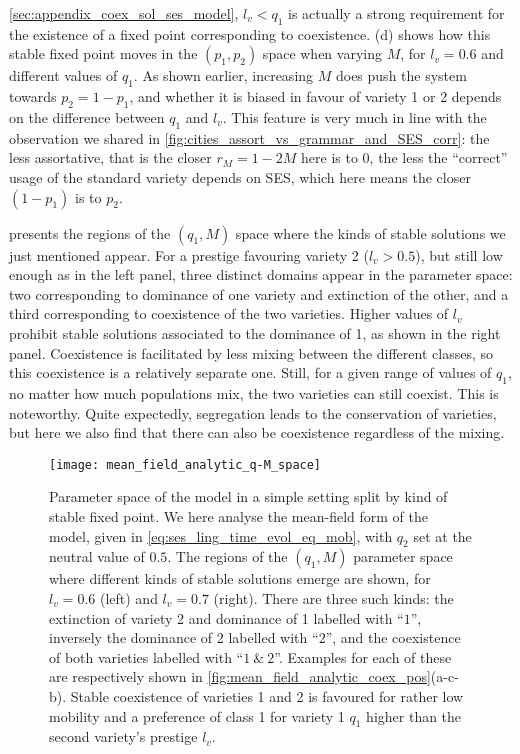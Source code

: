 \documentclass[../thesis.tex]{subfiles}
\begin{document}
\cref{sec:appendix_coex_sol_ses_model}, $l_v < q_1$ is actually a strong requirement for
the existence of a fixed point corresponding to coexistence.
(d) shows how this stable fixed point moves in
the $(p_1, p_2)$ space when varying $M$, for $l_v = 0.6$ and different values of $q_1$.
As shown earlier, increasing $M$ does push the system towards $p_2 = 1 - p_1$, and
whether it is biased in favour of variety 1 or 2 depends on the difference between $q_1$
and $l_v$. This feature is very much in line with the observation we shared in
\cref{fig:cities_assort_vs_grammar_and_SES_corr}: the less assortative, that is the
closer $r_M = 1 - 2 M$ here is to $0$, the less the ``correct'' usage of the standard
variety depends on \ac{SES}, which here means the closer $(1 - p_1)$ is to $p_2$.

 presents the regions of the $(q_1, M)$ space
where the kinds of stable solutions we just mentioned appear. For a prestige favouring
variety 2 ($l_v > 0.5$), but still low enough as in the left panel, three distinct
domains appear in the parameter space: two corresponding to dominance of one variety and
extinction of the other, and a third corresponding to coexistence of the two varieties.
Higher values of $l_v$ prohibit stable solutions associated to the dominance of 1, as
shown in the right panel. Coexistence is facilitated by less mixing between the
different classes, so this coexistence is a relatively separate one. Still, for a given
range of values of $q_1$, no matter how much populations mix, the two varieties can
still coexist. This is noteworthy. Quite expectedly, segregation leads to the
conservation of varieties, but here we also find that there can also be coexistence
regardless of the mixing.
\begin{figure}
  \centering
  \texttt{[image: mean\_field\_analytic\_q-M\_space]}
  \caption{Parameter space of the model in a simple setting split by kind of stable
  fixed point. We here analyse the mean-field form of the model, given in
  \cref{eq:ses_ling_time_evol_eq_mob}, with $q_2$ set at the neutral value of $0.5$. The
  regions of the $(q_1, M)$ parameter space where different kinds of stable solutions
  emerge are shown, for $l_v = 0.6$ (left) and $l_v = 0.7$ (right). There are three such
  kinds: the extinction of variety 2 and dominance of 1 labelled with ``$1$'', inversely
  the dominance of 2 labelled with ``$2$'', and the coexistence of both varieties
  labelled with ``$1~\&~2$''. Examples for each of these are respectively shown in
  \cref{fig:mean_field_analytic_coex_pos}(a-c-b). Stable coexistence of varieties 1 and
  2 is favoured for rather low mobility and a preference of class 1 for variety 1 $q_1$
  higher than the second variety's prestige $l_v$.}
  \label{fig:mean_field_analytic_q-M_space}
\end{figure}
\end{document}
